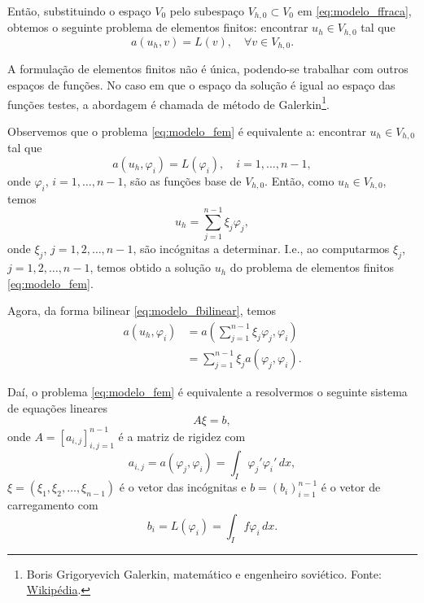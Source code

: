 Então, substituindo o espaço $V_0$ pelo subespaço $V_{h,0}\subset V_0$ em \eqref{eq:modelo_ffraca}, obtemos o seguinte problema de elementos finitos: encontrar $u_h\in V_{h,0}$ tal que
\begin{equation}\label{eq:modelo_fem}
  a(u_h,v) = L(v),\quad\forall v\in V_{h,0}.
\end{equation}

\begin{obs}
  A formulação de elementos finitos não é única, podendo-se trabalhar com outros espaços de funções. No caso em que o espaço da solução é igual ao espaço das funções testes, a abordagem é chamada de método de Galerkin\footnote{Boris Grigoryevich Galerkin, matemático e engenheiro soviético. Fonte: \href{https://pt.wikipedia.org/wiki/Boris_Galerkin}{Wikipédia}.}.
\end{obs}

Observemos que o problema \eqref{eq:modelo_fem} é equivalente a: encontrar $u_h\in V_{h,0}$ tal que
\begin{equation}
  a(u_h,\varphi_i) = L(\varphi_i),\quad i=1, \dotsc, n-1,
\end{equation}
onde $\varphi_i$, $i=1,\dotsc,n-1$, são as funções base de $V_{h,0}$. Então, como $u_h\in V_{h,0}$, temos
\begin{equation}
  u_h = \sum_{j=1}^{n-1}\xi_j\varphi_j,
\end{equation}
onde $\xi_j$, $j=1,2,\dotsc,n-1$, são incógnitas a determinar. I.e., ao computarmos $\xi_j$, $j=1,2,\dotsc,n-1$, temos obtido a solução $u_h$ do problema de elementos finitos \ref{eq:modelo_fem}.

Agora, da forma bilinear \eqref{eq:modelo_fbilinear}, temos
\begin{align}
  a(u_h,\varphi_i) &= a\left(\sum_{j=1}^{n-1}\xi_j\varphi_j,\varphi_i\right)\\
  &= \sum_{j=1}^{n-1}\xi_j a(\varphi_j,\varphi_i).
\end{align}

Daí, o problema \eqref{eq:modelo_fem} é equivalente a resolvermos o seguinte sistema de equações lineares
\begin{equation}\label{eq:modelo_fem_sis}
  A\xi = b,
\end{equation}
onde $A = [a_{i,j}]_{i,j=1}^{n-1}$ é a matriz de rigidez com
\begin{equation}
  a_{i,j} = a(\varphi_j,\varphi_i) = \int_{I}\varphi_j'\varphi_i'\,dx,
\end{equation}
$\xi = (\xi_1,\xi_2,\dotsc,\xi_{n-1})$ é o vetor das incógnitas e $b = (b_{i})_{i=1}^{n-1}$ é o vetor de carregamento com
\begin{equation}
  b_i = L(\varphi_i) = \int_If \varphi_i\,dx.
\end{equation}

